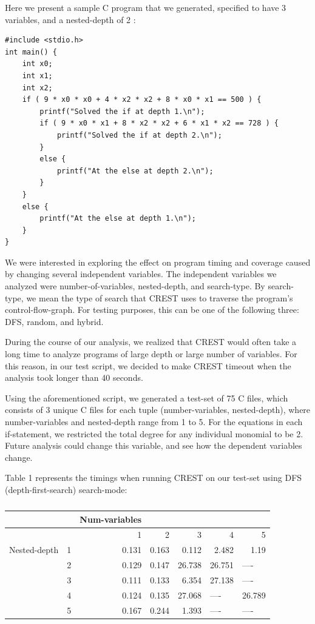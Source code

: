 \documentclass[oribibl]{llncs}
\begin{document}
Here we present a sample C program that we generated, specified to have 3 variables, and a nested-depth of 2 :

\begin{verbatim}
#include <stdio.h>
int main() {
	int x0;
	int x1;
	int x2;
    if ( 9 * x0 * x0 + 4 * x2 * x2 + 8 * x0 * x1 == 500 ) {
        printf("Solved the if at depth 1.\n");
        if ( 9 * x0 * x1 + 8 * x2 * x2 + 6 * x1 * x2 == 728 ) {
            printf("Solved the if at depth 2.\n");
        }
        else {
        	printf("At the else at depth 2.\n");
        }
    }
    else {
        printf("At the else at depth 1.\n");
    }
}
\end{verbatim}

We were interested in exploring the effect on program timing and coverage caused by changing several independent variables. The independent variables we analyzed were number-of-variables, nested-depth, and search-type. By search-type, we mean the type of search that CREST uses to traverse the program's control-flow-graph. For testing purposes, this can be one of the following three: DFS, random, and hybrid.

During the course of our analysis, we realized that CREST would often take a long time to analyze programs of large depth or large number of variables. For this reason, in our test script, we decided to make CREST timeout when the analysis took longer than 40 seconds.

Using the aforementioned script, we generated a test-set of 75 C files, which consists of 3 unique C files for each tuple (number-variables, nested-depth), where number-variables and nested-depth range from 1 to 5. For the equations in each if-statement, we restricted the total degree for any individual monomial to be 2. Future analysis could change this variable, and see how the dependent variables change.



Table 1 represents the timings when running CREST on our test-set using DFS (depth-first-search) search-mode:

\begin{table}[htbp]
\caption{}
\begin{tabular}{|l|r|r|r|r|r|l|}
\hline
 & \multicolumn{1}{l|}{} & \multicolumn{1}{l|}{Num-variables} & \multicolumn{1}{l|}{} & \multicolumn{1}{l|}{} & \multicolumn{1}{l|}{} &  \\ \hline
 & \multicolumn{1}{l|}{} & 1 & 2 & 3 & 4 & \multicolumn{1}{r|}{5} \\ \hline
Nested-depth & 1 & 0.131 & 0.163 & 0.112 & 2.482 & \multicolumn{1}{r|}{1.19} \\ \hline
 & 2 & 0.129 & 0.147 & 26.738 & 26.751 & ---- \\ \hline
 & 3 & 0.111 & 0.133 & 6.354 & 27.138 & ---- \\ \hline
 & 4 & 0.124 & 0.135 & 27.068 & \multicolumn{1}{l|}{----} & \multicolumn{1}{r|}{26.789} \\ \hline
 & 5 & 0.167 & 0.244 & 1.393 & \multicolumn{1}{l|}{----} & ---- \\ \hline
\end{tabular}
\label{DFS timings (in seconds)}
\end{table}
\end{document}
